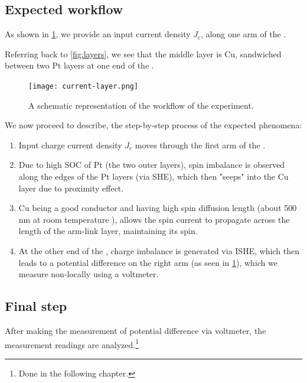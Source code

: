 \subsection{Expected workflow}

As shown in \cref{fig:layer-workflow}, we provide an input current density \( J_c \), along one arm of the \Hst.

Referring back to \cref{fig:layers}, we see that the middle layer is Cu, sandwiched between two Pt layers at one end of the \Hst.

\begin{figure}
    \centering
    \texttt{[image: current-layer.png]}
    \caption{A schematic representation of the workflow of the experiment.}
    \label{fig:layer-workflow}
\end{figure}

We now proceed to describe, the step-by-step process of the expected phenomena:

\begin{enumerate}
    \item Input charge current density \( J_c \) moves through the first arm of the \Hst.
    \item Due to high SOC of Pt (the two outer layers), spin imbalance is observed along the edges of the Pt layers (via SHE), which then "seeps" into the Cu layer due to proximity effect. %
    \item Cu being a good conductor and having high spin diffusion length (about 500 nm at room temperature \cite{Kimura_2005}), allows the spin current to propagate across the length of the arm-link layer, maintaining its spin.
    \item At the other end of the \Hst, charge imbalance is generated via ISHE, which then leads to a potential difference on the right arm (as seen in \cref{fig:layer-workflow}), which we measure non-locally using a voltmeter.
\end{enumerate}


\subsection{Final step}

After making the measurement of potential difference via voltmeter, the measurement readings are analyzed.\footnote{Done in the following chapter.}
